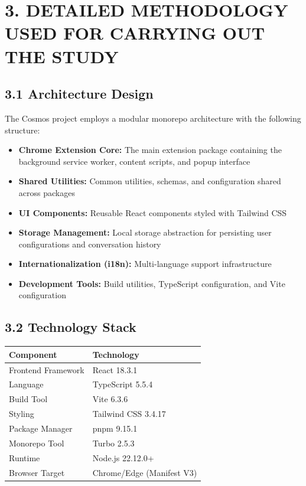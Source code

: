 \documentclass[12pt,a4paper]{article}
\begin{document}
\vspace{0.5cm}

\section*{\textbf{3. DETAILED METHODOLOGY USED FOR CARRYING OUT THE STUDY}}

\subsection*{\textbf{3.1 Architecture Design}}

The Cosmos project employs a modular monorepo architecture with the following structure:

\begin{itemize}
    \item \textbf{Chrome Extension Core:} The main extension package containing the background service worker, content scripts, and popup interface
    \item \textbf{Shared Utilities:} Common utilities, schemas, and configuration shared across packages
    \item \textbf{UI Components:} Reusable React components styled with Tailwind CSS
    \item \textbf{Storage Management:} Local storage abstraction for persisting user configurations and conversation history
    \item \textbf{Internationalization (i18n):} Multi-language support infrastructure
    \item \textbf{Development Tools:} Build utilities, TypeScript configuration, and Vite configuration
\end{itemize}

\subsection*{\textbf{3.2 Technology Stack}}

\begin{table}[h]
\centering
\begin{tabular}{|l|l|}
\hline
\textbf{Component} & \textbf{Technology} \\
\hline
Frontend Framework & React 18.3.1 \\
\hline
Language & TypeScript 5.5.4 \\
\hline
Build Tool & Vite 6.3.6 \\
\hline
Styling & Tailwind CSS 3.4.17 \\
\hline
Package Manager & pnpm 9.15.1 \\
\hline
Monorepo Tool & Turbo 2.5.3 \\
\hline
Runtime & Node.js 22.12.0+ \\
\hline
Browser Target & Chrome/Edge (Manifest V3) \\
\hline
\end{tabular}
\end{table}
\end{document}
